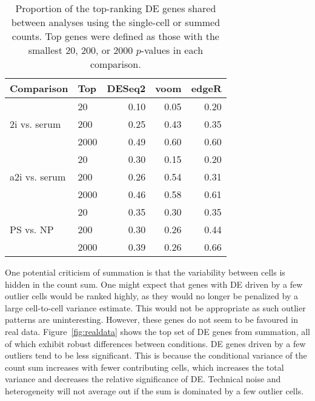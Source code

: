 \documentclass{article}
\begin{document}
\begin{table}[btp]
\caption{Proportion of the top-ranking DE genes shared between analyses using the single-cell or summed counts.
Top genes were defined as those with the smallest 20, 200, or 2000 $p$-values in each comparison.
}
\label{tab:realrank}
\begin{center}
\begin{tabular}{l l r r r}
\hline
\textbf{Comparison} & \textbf{Top} & \textbf{DESeq2} & \textbf{voom} & \textbf{edgeR} \\
\hline
\multirow{3}{*}{2i vs. serum} 
& 20 & 0.10 & 0.05 & 0.20 \\
& 200 & 0.25 & 0.43 & 0.35 \\
& 2000 & 0.49 & 0.60 & 0.60 \\
\hline
\multirow{3}{*}{a2i vs. serum} 
& 20 & 0.30 & 0.15 & 0.20 \\
& 200 & 0.26 & 0.54 & 0.31 \\
& 2000 & 0.46 & 0.58 & 0.61 \\
\hline
\multirow{3}{*}{PS vs. NP} 
& 20 & 0.35 & 0.30 & 0.35 \\
& 200 & 0.30 & 0.26 & 0.44 \\
& 2000 & 0.39 & 0.26 & 0.66 \\
\hline
\end{tabular}
\end{center}
\end{table}

One potential criticism of summation is that the variability between cells is hidden in the count sum.
One might expect that genes with DE driven by a few outlier cells would be ranked highly, as they would no longer be penalized by a large cell-to-cell variance estimate.
This would not be appropriate as such outlier patterns are uninteresting.
However, these genes do not seem to be favoured in real data.
Figure~\ref{fig:realdata} shows the top set of DE genes from summation, all of which exhibit robust differences between conditions.
DE genes driven by a few outliers tend to be less significant.
This is because the conditional variance of the count sum increases with fewer contributing cells, 
    which increases the total variance and decreases the relative significance of DE.
Technical noise and heterogeneity will not average out if the sum is dominated by a few outlier cells.

\end{document}
